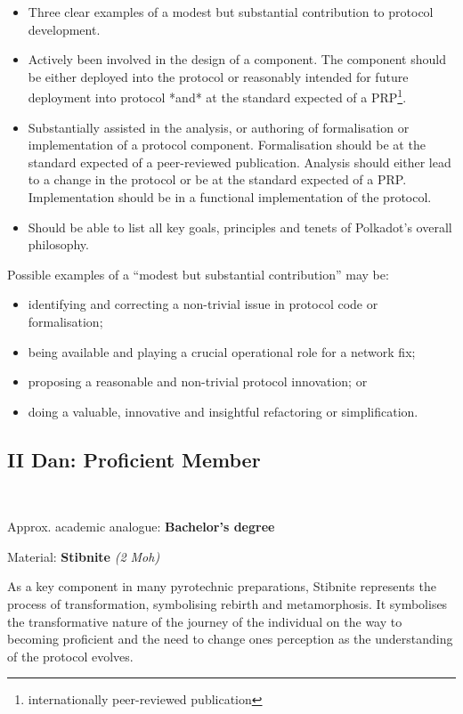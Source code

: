 \documentclass[9pt,oneside]{amsart}
\begin{document}
\begin{itemize}
\item Three clear examples of a modest but substantial contribution to protocol development.
\item Actively been involved in the design of a component. The component should be either deployed into the protocol or reasonably intended for future deployment into protocol *and* at the standard expected of a PRP\footnote{internationally peer-reviewed publication}.
\item Substantially assisted in the analysis, or authoring of formalisation or implementation of a protocol component. Formalisation should be at the standard expected of a peer-reviewed publication. Analysis should either lead to a change in the protocol or be at the standard expected of a PRP. Implementation should be in a functional implementation of the protocol.
\item Should be able to list all key goals, principles and tenets of Polkadot's overall philosophy.
\end{itemize}

Possible examples of a ``modest but substantial contribution'' may be:

\begin{itemize}
\item identifying and correcting a non-trivial issue in protocol code or formalisation;
\item being available and playing a crucial operational role for a network fix;
\item proposing a reasonable and non-trivial protocol innovation; or
\item doing a valuable, innovative and insightful refactoring or simplification.
\end{itemize}

\subsection{II Dan: Proficient Member}\label{ii-dan-proficient-member}~\\


Approx. academic analogue: \textbf{Bachelor's degree}

Material: \textbf{Stibnite} \emph{(2 Moh)}

As a key component in many pyrotechnic preparations, Stibnite represents the process of transformation, symbolising rebirth and metamorphosis. It symbolises the transformative nature of the journey of the individual on the way to becoming proficient and the need to change ones perception as the understanding of the protocol evolves.
\end{document}
